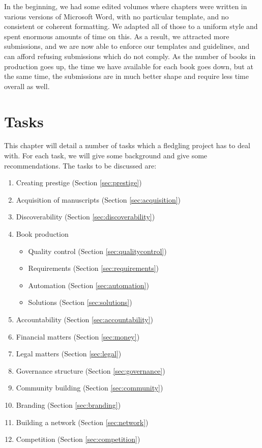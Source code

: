 \documentclass[nonflat,smallfont
]{langsci/langscibook}
\begin{document}
In the beginning, we had some edited volumes where chapters were written in various versions of Microsoft Word, with no particular template, and no consistent or coherent formatting. We adapted all of those to a uniform style and spent enormous amounts of time on this. As a result, we attracted more submissions, and we are now able to enforce our templates and guidelines, and can afford refusing submissions which do not comply. As the number of books in production goes up, the time we have available for each book goes down, but at the same time, the submissions are in much better shape and require less time overall as well. 

\chapter{Tasks}
This chapter will detail a number of tasks which a fledgling project has to deal with. For each task, we will give some background and give some recommendations. The tasks to be discussed are:

\begin{enumerate}
 \item Creating prestige (Section \ref{sec:prestige})
 \item Acquisition of manuscripts (Section \ref{sec:acquisition})
 \item Discoverability (Section \ref{sec:discoverability})
 \item Book production 
 \begin{itemize}
  \item Quality control (Section \ref{sec:qualitycontrol})
  \item Requirements (Section \ref{sec:requirements})
  \item Automation (Section \ref{sec:automation})
  \item Solutions (Section \ref{sec:solutions})
 \end{itemize}
 \item Accountability (Section \ref{sec:accountability})
 \item Financial matters (Section \ref{sec:money})
 \item Legal matters (Section \ref{sec:legal})
 \item Governance structure (Section \ref{sec:governance})
 \item Community building (Section \ref{sec:community})
 \item Branding (Section \ref{sec:branding})
 \item Building a network (Section \ref{sec:network})
 \item Competition (Section \ref{sec:competition})
\end{enumerate}
\end{document}
